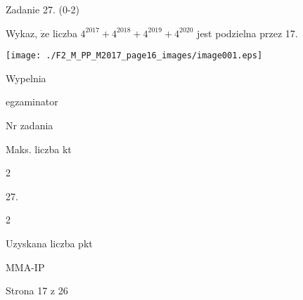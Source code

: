 \documentclass[a4paper,12pt]{article}
\begin{document}
Zadanie 27. (0-2)

Wykaz, $\dot{\mathrm{z}}\mathrm{e}$ liczba $4^{2017}+4^{2018}+4^{2019}+4^{2020}$ jest podzielna przez 17.
\begin{center}
\texttt{[image: ./F2\_M\_PP\_M2017\_page16\_images/image001.eps]}
\end{center}
Wypelnia

egzaminator

Nr zadania

Maks. liczba kt

2

27.

2

Uzyskana liczba pkt

MMA-IP

Strona 17 z 26
\end{document}
